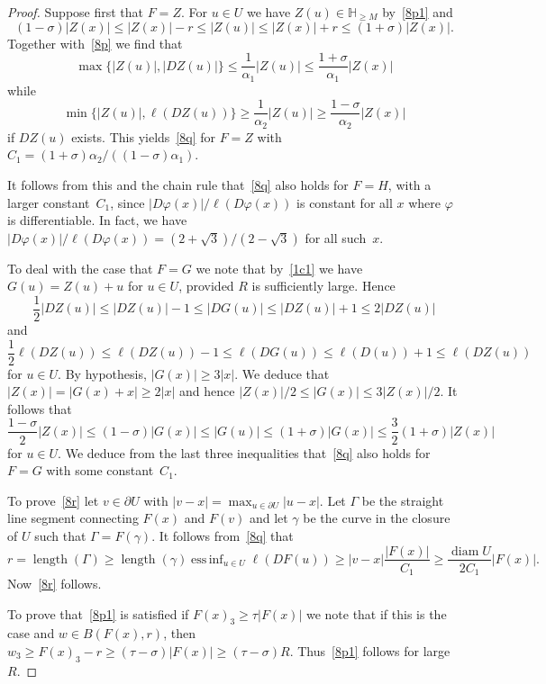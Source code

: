 \documentclass[12pt,a4paper]{amsart}
\theoremstyle{plain}
\theoremstyle{definition}
\theoremstyle{remark}
\newcommand{\diam}{\operatorname{diam}}
\DeclareMathOperator*{\essinf}{ess\,inf}
\def\H{\mathbb H}
\def\length{\operatorname{length}}
\numberwithin{equation}{section}
\begin{document}
\begin{proof}
Suppose first that $F=Z$. 
For $u\in U$ we have $Z(u)\in\H_{\geq M}$ by~\eqref{8p1}
and 
\begin{equation}\label{8r1}
(1-\sigma)|Z(x)|\leq |Z(x)|-r\leq |Z(u)|\leq|Z(x)|+r\leq  (1+\sigma)|Z(x)|.
\end{equation}
Together with~\eqref{8p} we find that
\begin{equation}\label{8s}
\max \{|Z(u)|,|DZ(u)|\} \leq \frac{1}{\alpha_1}|Z(u)|\leq \frac{1+\sigma}{\alpha_1}|Z(x)|
\end{equation}
while
\begin{equation}\label{8t}
\min \{|Z(u)|,\ell(DZ(u))\} \geq \frac{1}{\alpha_2}|Z(u)|\geq \frac{1-\sigma}{\alpha_2}|Z(x)|
\end{equation}
if $DZ(u)$ exists. 
This yields~\eqref{8q} for $F=Z$ with $C_1=(1+\sigma)\alpha_2/((1-\sigma)\alpha_1)$.

It follows from this and the chain rule that~\eqref{8q} also holds for $F=H$, with
a larger constant~$C_1$, since 
$|D\varphi(x)|/\ell(D\varphi(x))$ is constant for all $x$ where $\varphi$ is 
differentiable. In fact, we have $|D\varphi(x)|/\ell(D\varphi(x))=(2+\sqrt{3})/(2-\sqrt{3})$
for all such~$x$.

To deal with the case that $F=G$ we note that 
by~\eqref{1c1} we have $G(u)=Z(u)+u$ for $u\in U$, 
provided $R$ is sufficiently large. Hence
\begin{equation}\label{8u}
\frac12 |DZ(u)|\leq |DZ(u)|-1\leq |DG(u)|\leq |DZ(u)|+1\leq 2|DZ(u)|
\end{equation}
and 
\begin{equation}\label{8v}
\frac12 \ell(DZ(u))\leq \ell(DZ(u))-1\leq \ell(DG(u))\leq \ell(D(u))+1\leq\ell(DZ(u)) 
\end{equation}
for $u\in U$.
By hypothesis, $|G(x)|\geq 3|x|$.
We deduce that $|Z(x)|=|G(x)+x|\geq 2|x|$
and hence $|Z(x)|/2\leq |G(x)|\leq 3|Z(x)|/2$.
It follows that
\begin{equation}\label{8w}
\frac{1-\sigma}{2}|Z(x)|
\leq (1-\sigma)|G(x)|\leq |G(u)|
\leq (1+\sigma)|G(x)|
\leq \frac32(1+\sigma)|Z(x)|
\end{equation}
for $u\in U$.
We deduce 
from the last three inequalities 
that~\eqref{8q} also holds for $F=G$ with some constant~$C_1$.

To prove~\eqref{8r} let $v\in\partial U$ with $|v-x|=\max_{u\in\partial U}|u-x|$.
Let $\Gamma$ be the straight line segment connecting $F(x)$ and $F(v)$
and let $\gamma$ be the curve in the closure of $U$ such that $\Gamma=F(\gamma)$.
It follows from~\eqref{8q} that
\begin{equation}\label{8x}
r = \length( \Gamma)
\geq \length(\gamma) \essinf_{u\in U} \ell(DF(u))
\geq |v-x| \frac{|F(x)|}{C_1}
\geq  \frac{\diam U}{2C_1} |F(x)|.
\end{equation}
Now~\eqref{8r} follows.

To prove that~\eqref{8p1} is satisfied if $F(x)_3\geq \tau|F(x)|$ we note that
if this is the case and $w\in B(F(x),r)$, then
$w_3\geq F(x)_3-r\geq (\tau-\sigma)|F(x)|\geq  (\tau-\sigma)R$.
Thus~\eqref{8p1} follows for large~$R$.
\end{proof}
\end{document}
